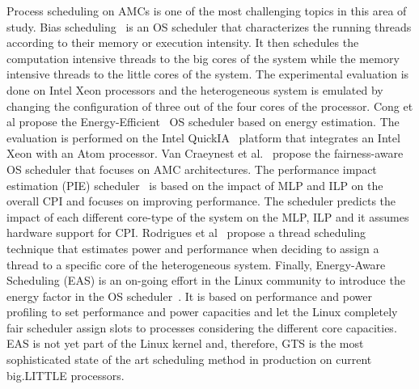 Process scheduling on AMCs is one of the most challenging topics in this area of study.
Bias scheduling~\cite{Koufaty_bias} is an OS scheduler that characterizes the running 
threads according to their memory or execution intensity. 
It then schedules the computation intensive threads to the big cores of the system while the memory intensive threads to the little cores of the system.
The experimental evaluation is done on Intel Xeon processors and the heterogeneous system is emulated by changing the configuration of three out of the four cores of the processor.
Cong et al propose the Energy-Efficient~\cite{Cong_quickIA} OS scheduler based on energy estimation. The evaluation is performed on the Intel QuickIA~\cite{quickIA} platform that integrates an Intel Xeon with an Atom processor. 
Van Craeynest et al.~\cite{VanCraeynest_fairness} propose the fairness-aware OS scheduler that focuses on AMC architectures. 
The performance impact estimation (PIE) scheduler~\cite{VanCraeynest_PIE} is based on the impact of MLP and ILP on the overall CPI and focuses on improving performance.
The scheduler predicts the impact of each different core-type of the system on the MLP, ILP and it assumes hardware support for CPI. 
Rodrigues et al~\cite{Rodrigues_thread_scheduling} propose a thread scheduling technique that estimates power and performance when deciding to assign a thread to a specific core of the heterogeneous system. 
Finally, Energy-Aware Scheduling (EAS) is an on-going effort in the Linux community to introduce 
the energy factor in the OS scheduler~\cite{EAS, EAS_Linux}. It is based on performance and power 
profiling to set performance and power capacities and let the Linux completely fair scheduler 
assign slots to processes considering the different core capacities. EAS is not yet part 
of the Linux kernel and, therefore, GTS is the most sophisticated state of the art scheduling method 
in production on current big.LITTLE processors.





